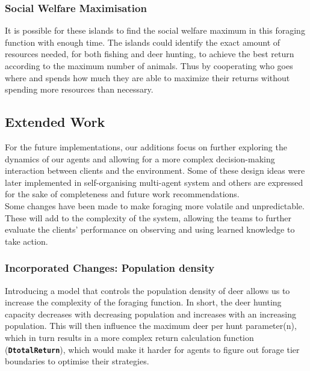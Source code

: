 \subsubsection{Social Welfare Maximisation}

It is possible for these islands to find the social welfare maximum in this foraging function with enough time. The islands could identify the exact amount of resources needed, for both fishing and deer hunting, to achieve the best return according to the maximum number of animals. Thus by cooperating who goes where and spends how much they are able to maximize their returns without spending more resources than necessary.\\

\subsection{Extended Work}

For the future implementations, our additions focus on further exploring the dynamics of our agents and allowing for a more complex decision-making interaction between clients and the environment. Some of these design ideas were later implemented in self-organising multi-agent system and others are expressed for the sake of completeness and future work recommendations.\\

Some changes have been made to make foraging more volatile and unpredictable. These will add to the complexity of the system, allowing the teams to further evaluate the clients’ performance on observing and using learned knowledge to take action.\\

\subsubsection{Incorporated Changes: Population density}

Introducing a model that controls the population density of deer allows us to increase the complexity of the foraging function. In short, the deer hunting capacity decreases with decreasing population and increases with an increasing population. This will then influence the maximum deer per hunt parameter(n), which in turn results in a more complex return calculation function (\texttt{\textbf{DtotalReturn}}), which would make it harder for agents to figure out forage tier boundaries to optimise their strategies.\\

